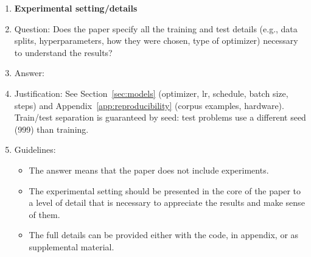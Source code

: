 \documentclass{article}
\begin{document}
\begin{enumerate}
\item {\bf Experimental setting/details}
    \item[] Question: Does the paper specify all the training and test details (e.g., data splits, hyperparameters, how they were chosen, type of optimizer) necessary to understand the results?
    \item[] Answer: \answerYes{}
    \item[] Justification: See Section~\ref{sec:models} (optimizer, lr, schedule, batch size, steps) and Appendix~\ref{app:reproducibility} (corpus examples, hardware). Train/test separation is guaranteed by seed: test problems use a different seed (999) than training.
    \item[] Guidelines:
    \begin{itemize}
        \item The answer \answerNA{} means that the paper does not include experiments.
        \item The experimental setting should be presented in the core of the paper to a level of detail that is necessary to appreciate the results and make sense of them.
        \item The full details can be provided either with the code, in appendix, or as supplemental material.
    \end{itemize}


\end{enumerate}
\end{document}
